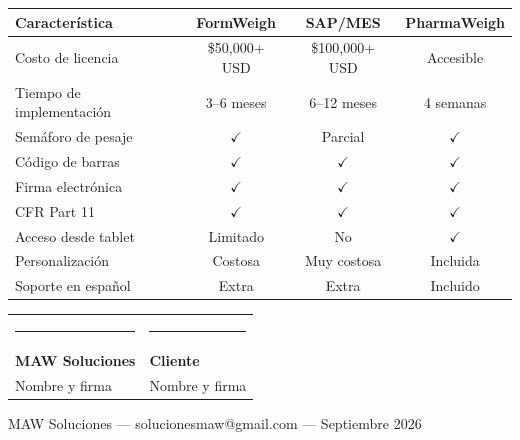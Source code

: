 \documentclass[11pt,letterpaper]{article}
\begin{document}
\noindent\begin{tabularx}{\linewidth}{@{}>{\raggedright\arraybackslash}X c c c@{}}
\toprule
\textbf{Característica} & \textbf{FormWeigh} & \textbf{SAP/MES} & \textbf{PharmaWeigh} \\
\midrule
Costo de licencia & \$50,000+ USD & \$100,000+ USD & Accesible \\
Tiempo de implementación & 3--6 meses & 6--12 meses & 4 semanas \\
Semáforo de pesaje & $\checkmark$ & Parcial & $\checkmark$ \\
Código de barras & $\checkmark$ & $\checkmark$ & $\checkmark$ \\
Firma electrónica & $\checkmark$ & $\checkmark$ & $\checkmark$ \\
21 CFR Part 11 & $\checkmark$ & $\checkmark$ & $\checkmark$ \\
Acceso desde tablet & Limitado & No & $\checkmark$ \\
Personalización & Costosa & Muy costosa & Incluida \\
Soporte en español & Extra & Extra & Incluido \\
\bottomrule
\end{tabularx}

\vspace{20pt}

\noindent\begin{tabularx}{\linewidth}{@{}>{\centering\arraybackslash}X >{\centering\arraybackslash}X@{}}
\rule{6cm}{0.4pt} & \rule{6cm}{0.4pt} \\
\textbf{MAW Soluciones} & \textbf{Cliente} \\
Nombre y firma & Nombre y firma \\
\end{tabularx}

\vspace{16pt}

\begin{center}
{\footnotesize\color{gristexto}MAW Soluciones --- solucionesmaw@gmail.com --- Septiembre 2026}
\end{center}
\end{document}
